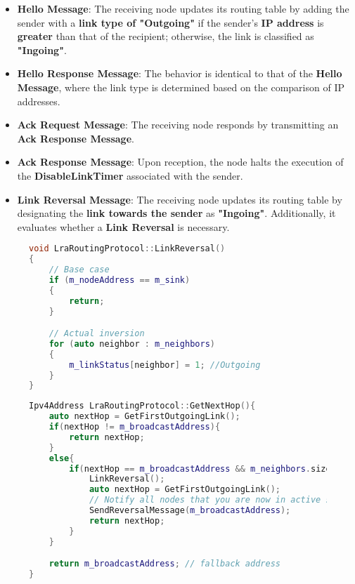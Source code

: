 \documentclass[../report.tex]{subfiles}
\begin{document}
\begin{itemize}
    \item \textbf{Hello Message}: The receiving node updates its routing table by adding the sender with a \textbf{link type of "Outgoing"} if the sender's \textbf{IP address} is \textbf{greater} than that of the recipient; otherwise, the link is classified as \textbf{"Ingoing"}.
    \item \textbf{Hello Response Message}: The behavior is identical to that of the \textbf{Hello Message}, where the link type is determined based on the comparison of IP addresses.
    \item \textbf{Ack Request Message}: The receiving node responds by transmitting an \textbf{Ack Response Message}.
    \item \textbf{Ack Response Message}: Upon reception, the node halts the execution of the \textbf{DisableLinkTimer} associated with the sender.
    \item \textbf{Link Reversal Message}: The receiving node updates its routing table by designating the \textbf{link towards the sender} as \textbf{"Ingoing"}. Additionally, it evaluates whether a \textbf{Link Reversal} is necessary.
\end{itemize}


\begin{figure}[H] %
\begin{lstlisting}[language=C++, caption={Link Reversal Method},captionpos=b]
void LraRoutingProtocol::LinkReversal()
{
    // Base case
    if (m_nodeAddress == m_sink)
    {
        return;
    }

    // Actual inversion
    for (auto neighbor : m_neighbors)
    {
        m_linkStatus[neighbor] = 1; //Outgoing
    }
}
\end{lstlisting}
\end{figure}

\begin{figure}[H] %
\begin{lstlisting}[language=C++, caption={Next Hop Find Method},captionpos=b]
Ipv4Address LraRoutingProtocol::GetNextHop(){
    auto nextHop = GetFirstOutgoingLink();
    if(nextHop != m_broadcastAddress){
        return nextHop;
    }
    else{
        if(nextHop == m_broadcastAddress && m_neighbors.size() > 0){
            LinkReversal();
            auto nextHop = GetFirstOutgoingLink();
            // Notify all nodes that you are now in active state.
            SendReversalMessage(m_broadcastAddress);
            return nextHop;
        }
    }

    return m_broadcastAddress; // fallback address
}
\end{lstlisting}
\end{figure}
\end{document}
